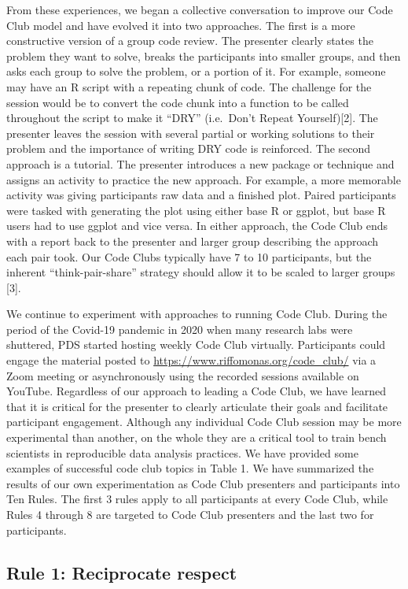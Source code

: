 \documentclass[
  11pt,
]{article}
\begin{document}
From these experiences, we began a collective conversation to improve
our Code Club model and have evolved it into two approaches. The first
is a more constructive version of a group code review. The presenter
clearly states the problem they want to solve, breaks the participants
into smaller groups, and then asks each group to solve the problem, or a
portion of it. For example, someone may have an R script with a
repeating chunk of code. The challenge for the session would be to
convert the code chunk into a function to be called throughout the
script to make it ``DRY'' (i.e.~Don't Repeat Yourself){[}2{]}. The
presenter leaves the session with several partial or working solutions
to their problem and the importance of writing DRY code is reinforced.
The second approach is a tutorial. The presenter introduces a new
package or technique and assigns an activity to practice the new
approach. For example, a more memorable activity was giving participants
raw data and a finished plot. Paired participants were tasked with
generating the plot using either base R or ggplot, but base R users had
to use ggplot and vice versa. In either approach, the Code Club ends
with a report back to the presenter and larger group describing the
approach each pair took. Our Code Clubs typically have 7 to 10
participants, but the inherent ``think-pair-share'' strategy should
allow it to be scaled to larger groups {[}3{]}.

We continue to experiment with approaches to running Code Club. During
the period of the Covid-19 pandemic in 2020 when many research labs were
shuttered, PDS started hosting weekly Code Club virtually. Participants
could engage the material posted to
\url{https://www.riffomonas.org/code_club/} via a Zoom meeting or
asynchronously using the recorded sessions available on YouTube.
Regardless of our approach to leading a Code Club, we have learned that
it is critical for the presenter to clearly articulate their goals and
facilitate participant engagement. Although any individual Code Club
session may be more experimental than another, on the whole they are a
critical tool to train bench scientists in reproducible data analysis
practices. We have provided some examples of successful code club topics
in Table 1. We have summarized the results of our own experimentation as
Code Club presenters and participants into Ten Rules. The first 3 rules
apply to all participants at every Code Club, while Rules 4 through 8
are targeted to Code Club presenters and the last two for participants.

\hypertarget{rule-1-reciprocate-respect}{%
\subsection{Rule 1: Reciprocate
respect}\label{rule-1-reciprocate-respect}}
\end{document}
